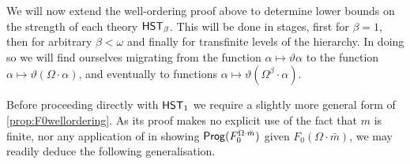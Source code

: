 \documentclass[UKenglish,cleveref,DIV=12]{scrartcl}
\theoremstyle{definition}
\theoremstyle{definition}
\newcommand{\kommentar}[1]{}
\begin{document}
 
 
 
 
 \kommentar{
Let $\gamma_0=1$ and $\gamma_{k+1}= C(\Omega\cdot m,\gamma_k)\cap\Omega$. Then
$\vartheta(\Omega\cdot m)\le\sup_{k<\omega}\gamma_k$ and
$\HST_0^m\proves\wo_0(\bar{\gamma_0})$ holds. Moreover, if $\HST_0^m\proves
\wo_0(\bar{\alpha})$ for every $\alpha<\gamma_k$ we may deduce $\HST_0^m\proves
\wo_0(\bar{\alpha})$ for every $\alpha<\gamma_{k+1}$ by induction on the
definition of $\gamma_{k+1}$ thus: suppose $\beta\in C_{k+1}(\Omega\cdot
m,\gamma_k)\cap\Omega$ and $\HST_0^m\proves \wo_0(\bar\alpha)$ for every
$\alpha\in C_{k}(\Omega\cdot m,\gamma_k)\cap\Omega$. If $\beta$ was enumerated
into $C_{k+1}(\Omega\cdot m,\gamma_k)$ by either (C1) or (C2),
$\HST_0^m\proves\wo_0(\bar\beta)$ is easily obtained from the induction
hypothesis. If, however, $\beta=\vartheta\xi$ for some $\xi\in C_{k}(\Omega\cdot
m,\gamma_k)\cap\Omega\cdot m$, $\xi=\Omega\cdot n+\alpha$ for some $n<m$,
$\alpha\in C_{k}(\Omega\cdot m,\gamma_k)\cap\Omega$ and
$\HST_0^m\proves\wo_0(\bar\xi^*)$ by the induction hypothesis, whence
\cref{prop:F0wellordering} implies $\HST_0^m\proves\wo_0(\bar\beta)$.

Since $\vartheta(\Omega\cdot m)\le\sup_{k<\omega}\gamma_k$, we obtain
$\HST_0^m\proves\wo_0(\bar\alpha)$ for every $\alpha<\vartheta(\Omega\cdot m)$ and
so $\HST_0^m\proves\TI(\mathord<\vartheta(\Omega\cdot m))$ by an application of
\Conec0.
}

We will now extend the well-ordering proof above to determine lower bounds on the strength of each
theory $\mathsf{HST}_\beta$. This will be done in stages, first for $\beta=1$, then for
arbitrary $\beta<\omega$ and finally for transfinite levels of the hierarchy. In
doing so we will find ourselves migrating from the function $\alpha\mapsto\vartheta\alpha$
to the function $\alpha\mapsto\vartheta(\Omega\cdot\alpha)$,
and eventually to functions $\alpha\mapsto\vartheta(\Omega^{\beta}\cdot\alpha)$.

Before proceeding directly with $\mathsf{HST}_1$ we require a slightly more general form
of \cref{prop:F0wellordering}. As its proof makes no explicit use of the fact that $m$ is finite,
nor any application of  in showing $\mathsf{Prog} (F^{\Omega\cdot \bar m}_0)$ given
$F_0(\Omega\cdot\bar m)$, we may readily deduce the following generalisation.
\end{document}
